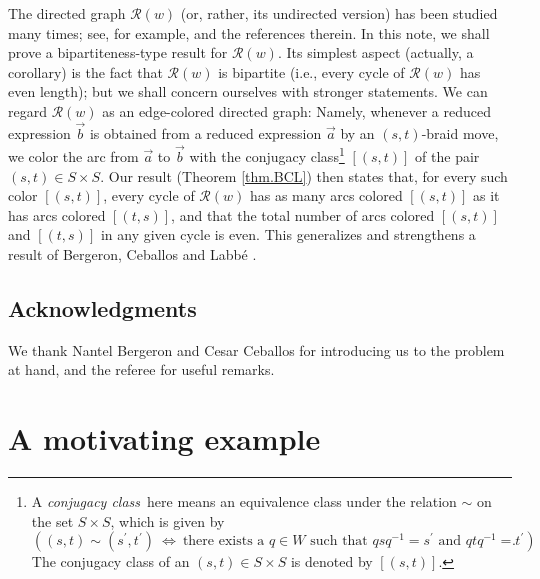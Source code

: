 \documentclass[numbers=enddot,12pt,final,onecolumn,notitlepage,abstracton]{scrartcl}%
\theoremstyle{definition}
\begin{document}
The directed graph $\mathcal{R}\left(  w\right)  $ (or, rather, its undirected
version) has been studied many times; see, for example, \cite{ReiRoi11} and
the references therein. In this note, we shall prove a bipartiteness-type
result for $\mathcal{R}\left(  w\right)  $. Its simplest aspect (actually, a
corollary) is the fact that $\mathcal{R}\left(  w\right)  $ is bipartite
(i.e., every cycle of $\mathcal{R}\left(  w\right)  $ has even length); but we
shall concern ourselves with stronger statements. We can regard $\mathcal{R}%
\left(  w\right)  $ as an edge-colored directed graph: Namely, whenever a
reduced expression $\overrightarrow{b}$ is obtained from a reduced expression
$\overrightarrow{a}$ by an $\left(  s,t\right)  $-braid move, we color the arc
from $\overrightarrow{a}$ to $\overrightarrow{b}$ with the conjugacy
class\footnote{A \emph{conjugacy class}\ here means an equivalence class under
the relation $\sim$ on the set $S\times S$, which is given by
\[
\left(  \left(  s,t\right)  \sim\left(  s^{\prime},t^{\prime}\right)
\ \Longleftrightarrow\ \text{there exists a }q\in W\text{ such that }%
qsq^{-1}=s^{\prime}\text{ and }qtq^{-1}=t^{\prime}\right)  .
\]
The conjugacy class of an $\left(  s,t\right)  \in S\times S$ is denoted by
$\left[  \left(  s,t\right)  \right]  $.} $\left[  \left(  s,t\right)
\right]  $ of the pair $\left(  s,t\right)  \in S\times S$. Our result
(Theorem \ref{thm.BCL}) then states that, for every such color $\left[
\left(  s,t\right)  \right]  $, every cycle of $\mathcal{R}\left(  w\right)  $
has as many arcs colored $\left[  \left(  s,t\right)  \right]  $ as it has
arcs colored $\left[  \left(  t,s\right)  \right]  $, and that the total
number of arcs colored $\left[  \left(  s,t\right)  \right]  $ and $\left[
\left(  t,s\right)  \right]  $ in any given cycle is even. This generalizes
and strengthens a result of Bergeron, Ceballos and Labb\'{e} \cite[Theorem
3.1]{BCL}.

\subsection*{Acknowledgments}

We thank Nantel Bergeron and Cesar Ceballos for introducing us to the problem
at hand, and the referee for useful remarks.

\section{\label{sect.motivate-ex}A motivating example}
\end{document}
